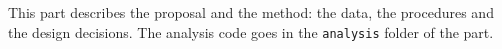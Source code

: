 
This part describes the proposal and the method: the data, the procedures and the design decisions.
The analysis code goes in the \texttt{analysis} folder of the part.
